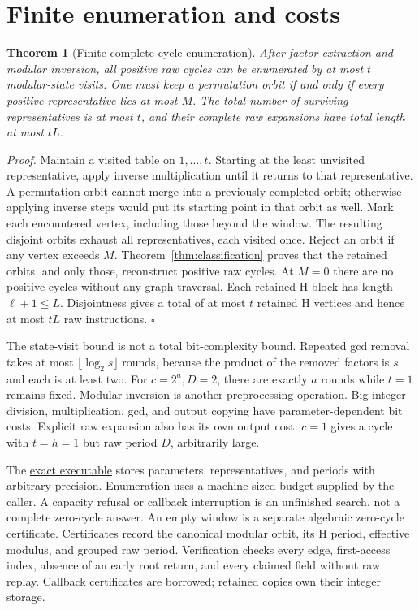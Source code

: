 \documentclass[11pt,letterpaper]{article}
\newtheorem{theorem}{Theorem}
\newenvironment{proof}{\noindent\textit{Proof.}}{\hfill\(\square\)}
\begin{document}
\section{Finite enumeration and costs}

\begin{theorem}[Finite complete cycle enumeration]
\label{thm:enumeration}
After factor extraction and modular inversion, all positive raw cycles can
be enumerated by at most $t$ modular-state visits. One must keep a permutation
orbit if and only if every positive representative lies at most $M$.
The total number of surviving representatives is at most $t$, and their
complete raw expansions have total length at most $tL$.
\end{theorem}
\begin{proof}
Maintain a visited table on $1,\ldots,t$. Starting at the least unvisited
representative, apply inverse multiplication until it returns to that
representative. A permutation orbit cannot merge into a previously completed
orbit; otherwise applying inverse steps would put its starting point in that
orbit as well. Mark each encountered vertex, including those beyond the
window. The resulting disjoint orbits exhaust all representatives, each
visited once. Reject an orbit if any vertex exceeds $M$. Theorem~\ref{thm:classification}
proves that the retained orbits, and only those, reconstruct positive raw
cycles. At $M=0$ there are no positive cycles without any graph traversal.
Each retained H block has length $\ell+1\le L$. Disjointness gives a total
of at most $t$ retained H vertices and hence at most $tL$ raw instructions.
\end{proof}

The state-visit bound is not a total bit-complexity bound.
Repeated gcd removal takes at most $\lfloor\log_2 s\rfloor$ rounds, because
the product of the removed factors is $s$ and each is at least two.
For $c=2^a,D=2$, there are exactly $a$ rounds while $t=1$ remains fixed.
Modular inversion is another preprocessing operation. Big-integer division,
multiplication, gcd, and output copying have parameter-dependent bit costs.
Explicit raw expansion also has its own output cost: $c=1$ gives a cycle
with $t=h=1$ but raw period $D$, arbitrarily large.

The \href{../go/AdditiveCycles.go}{exact executable} stores parameters,
representatives, and periods with arbitrary precision. Enumeration uses a
machine-sized budget supplied by the caller. A capacity refusal or
callback interruption is an unfinished search, not a complete zero-cycle
answer. An empty window is a separate algebraic zero-cycle certificate.
Certificates record the canonical modular orbit, its H period, effective
modulus, and grouped raw period. Verification checks every edge, first-access
index, absence of an early root return, and every claimed field without raw
replay. Callback certificates are borrowed; retained copies own their
integer storage.
\end{document}
